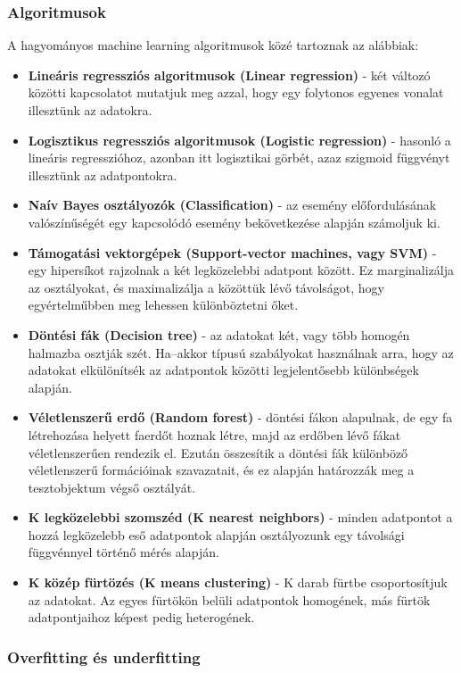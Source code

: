 \subsubsection{Algoritmusok}

A hagyományos machine learning algoritmusok közé tartoznak az alábbiak:

\begin{itemize}
\item \textbf{Lineáris regressziós algoritmusok (Linear regression)} - két változó közötti kapcsolatot mutatjuk meg azzal, hogy egy folytonos egyenes vonalat illesztünk az adatokra.
\item \textbf{Logisztikus regressziós algoritmusok (Logistic regression)} - hasonló a lineáris regresszióhoz, azonban itt logisztikai görbét, azaz szigmoid függvényt illesztünk az adatpontokra.
\item \textbf{Naív Bayes osztályozók (Classification)} - az esemény előfordulásának valószínűségét egy kapcsolódó esemény bekövetkezése alapján számoljuk ki.
\item \textbf{Támogatási vektorgépek (Support-vector machines, vagy SVM)} - egy hipersíkot rajzolnak a két legközelebbi adatpont között. Ez marginalizálja az osztályokat, és maximalizálja a közöttük lévő távolságot, hogy egyértelműbben meg lehessen különböztetni őket.
\item \textbf{Döntési fák (Decision tree)} - az adatokat két, vagy több homogén halmazba osztják szét. Ha–akkor típusú szabályokat használnak arra, hogy az adatokat elkülönítsék az adatpontok közötti legjelentősebb különbségek alapján.
\item \textbf{Véletlenszerű erdő (Random forest)} - döntési fákon alapulnak, de egy fa létrehozása helyett faerdőt hoznak létre, majd az erdőben lévő fákat véletlenszerűen rendezik el. Ezután összesítik a döntési fák különböző véletlenszerű formációinak szavazatait, és ez alapján határozzák meg a tesztobjektum végső osztályát.
\item \textbf{K legközelebbi szomszéd (K nearest neighbors)} - minden adatpontot a hozzá legközelebb eső adatpontok alapján osztályozunk egy távolsági függvénnyel történő mérés alapján. 
\item \textbf{K közép fürtözés (K means clustering)} - K darab fürtbe csoportosítjuk az adatokat. Az egyes fürtökön belüli adatpontok homogének, más fürtök adatpontjaihoz képest pedig heterogének. \cite{azure}
\end{itemize}


\subsubsection{Overfitting és underfitting}


